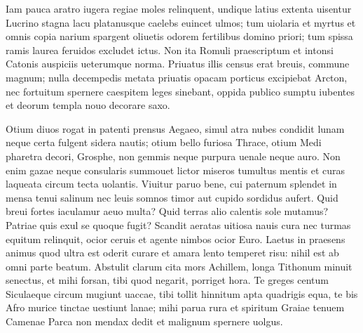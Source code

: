 \documentclass{book}
\newenvironment {carmen} [1] [\relax] 
  {\Titulus \Versus \incipit*\numerus{1}#1}
  {\endVersus}
\newcommand {\Sapphic}   {\Forma \strophae {0 \poena 00 \poena 1}}
\newcommand {\Alcaic}    {\Forma \strophae {0 \poena 01 \poena 2}}
\begin{document}
\begin{carmen}[\Alcaic]


Iam pauca aratro iugera regiae
 moles relinquent, undique latius
      extenta uisentur Lucrino
      stagna lacu platanusque caelebs 
euincet ulmos; tum uiolaria et                
myrtus et omnis copia narium
      spargent oliuetis odorem
      fertilibus domino priori; 
tum spissa ramis laurea feruidos
 excludet ictus. Non ita Romuli               
      praescriptum et intonsi Catonis
      auspiciis ueterumque norma. 
Priuatus illis census erat breuis,
 commune magnum; nulla decempedis
      metata priuatis opacam               
      porticus excipiebat Arcton, 
nec fortuitum spernere caespitem
 leges sinebant, oppida publico
      sumptu iubentes et deorum
      templa nouo decorare saxo.                

\end{carmen}

\begin{carmen}[\Sapphic]


Otium diuos rogat in patenti
 prensus Aegaeo, simul atra nubes
 condidit lunam neque certa fulgent
      sidera nautis; 
otium bello furiosa Thrace,               
 otium Medi pharetra decori,
 Grosphe, non gemmis neque purpura
      uenale neque auro. 
Non enim gazae neque consularis
 summouet lictor miseros tumultus               
 mentis et curas laqueata circum
      tecta uolantis. 
Viuitur paruo bene, cui paternum
 splendet in mensa tenui salinum
 nec leuis somnos timor aut cupido               
      sordidus aufert. 
Quid breui fortes iaculamur aeuo
 multa? Quid terras alio calentis
 sole mutamus? Patriae quis exul
      se quoque fugit?                
Scandit aeratas uitiosa nauis
 cura nec turmas equitum relinquit,
 ocior ceruis et agente nimbos
      ocior Euro. 
Laetus in praesens animus quod ultra est               
 oderit curare et amara lento
 temperet risu: nihil est ab omni
      parte beatum. 
Abstulit clarum cita mors Achillem,
 longa Tithonum minuit senectus,               
 et mihi forsan, tibi quod negarit,
      porriget hora. 
Te greges centum Siculaeque circum
 mugiunt uaccae, tibi tollit hinnitum
 apta quadrigis equa, te bis Afro                
     murice tinctae 
uestiunt lanae; mihi parua rura et
 spiritum Graiae tenuem Camenae
 Parca non mendax dedit et malignum
      spernere uolgus.                

\end{carmen}
\end{document}
